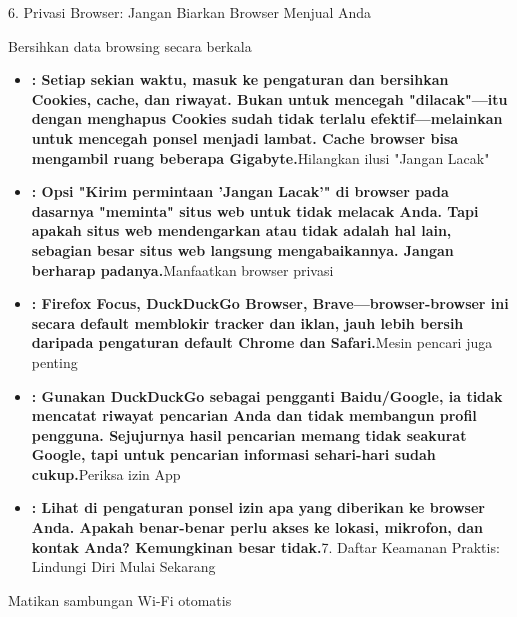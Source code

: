 6. Privasi Browser: Jangan Biarkan Browser Menjual Anda


Bersihkan data browsing secara berkala

\begin{itemize}
  \item \textbf{: Setiap sekian waktu, masuk ke pengaturan dan bersihkan Cookies, cache, dan riwayat. Bukan untuk mencegah "dilacak"—itu dengan menghapus Cookies sudah tidak terlalu efektif—melainkan untuk mencegah ponsel menjadi lambat. Cache browser bisa mengambil ruang beberapa Gigabyte.}Hilangkan ilusi "Jangan Lacak"
  \item \textbf{: Opsi "Kirim permintaan 'Jangan Lacak'" di browser pada dasarnya "meminta" situs web untuk tidak melacak Anda. Tapi apakah situs web mendengarkan atau tidak adalah hal lain, sebagian besar situs web langsung mengabaikannya. Jangan berharap padanya.}Manfaatkan browser privasi
  \item \textbf{: Firefox Focus, DuckDuckGo Browser, Brave—browser-browser ini secara default memblokir tracker dan iklan, jauh lebih bersih daripada pengaturan default Chrome dan Safari.}Mesin pencari juga penting
  \item \textbf{: Gunakan DuckDuckGo sebagai pengganti Baidu/Google, ia tidak mencatat riwayat pencarian Anda dan tidak membangun profil pengguna. Sejujurnya hasil pencarian memang tidak seakurat Google, tapi untuk pencarian informasi sehari-hari sudah cukup.}Periksa izin App
  \item \textbf{: Lihat di pengaturan ponsel izin apa yang diberikan ke browser Anda. Apakah benar-benar perlu akses ke lokasi, mikrofon, dan kontak Anda? Kemungkinan besar tidak.}7. Daftar Keamanan Praktis: Lindungi Diri Mulai Sekarang
\end{itemize}


Matikan sambungan Wi-Fi otomatis

